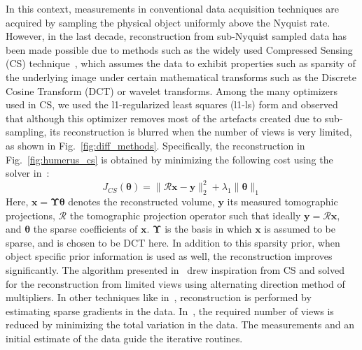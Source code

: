 \documentclass[journal]{IEEEtran}
\begin{document}
In this context, measurements in conventional data acquisition techniques are acquired by sampling the physical object uniformly above the Nyquist rate. However, in the last decade, reconstruction from sub-Nyquist sampled data has been made possible due to methods such as the widely used Compressed Sensing (CS) technique~\cite{Donoho,introCS}, which assumes the data to exhibit properties such as sparsity of the underlying image under certain mathematical transforms such as the Discrete Cosine Transform (DCT) or wavelet transforms. Among the many optimizers used in CS, we used the l1-regularized least squares (l1-ls) form and observed that although this optimizer removes most of the artefacts created due to sub-sampling, its reconstruction is blurred when the number of views is very limited, as shown in Fig.~\ref{fig:diff_methods}. Specifically, the reconstruction in Fig.~\ref{fig:humerus_cs} is obtained by minimizing the following cost using the solver in~\cite{l1ls}:
 \begin{equation}
J_{CS}(\boldsymbol{\theta}) = \lVert\boldsymbol{\mathcal{R} x}- \boldsymbol{y}\rVert_2^2  + \lambda_1\lVert\boldsymbol{\theta}\rVert_1
\label{Eq:simple_cs}
\end{equation}
Here, $\boldsymbol{x} = \boldsymbol{\Upsilon\theta}$ denotes the reconstructed volume, $\boldsymbol{y}$ its measured tomographic projections, $\boldsymbol{\mathcal{R}}$ the tomographic projection operator such that ideally $\boldsymbol{y} = \boldsymbol{\mathcal{R} x}$, and $\boldsymbol{\theta}$ the sparse coefficients of $\boldsymbol{x}$. $\boldsymbol{\Upsilon}$ is the basis in which $\boldsymbol{x}$ is assumed to be sparse, and is chosen to be DCT here.
In addition to this sparsity prior, when object specific prior information is  used as well, the reconstruction improves significantly. The algorithm presented in~\cite{Essam2015} drew inspiration from CS and solved for the reconstruction from limited views using alternating direction method of multipliers. In other techniques like in~\cite{Polak2017}, reconstruction is performed by estimating sparse gradients in the data. In~\cite{Li2015}, the required number of views is reduced by minimizing the total variation in the data. The measurements and an initial estimate of the data guide the iterative routines. 
\end{document}
